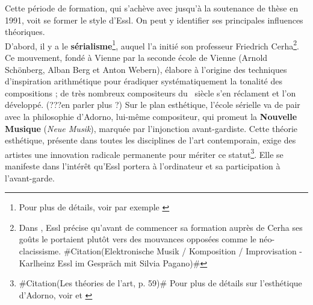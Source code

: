 \documentclass[a4paper,12pt]{article}
\newcommand{\zitat}[2]{\#Citation(#2)\#}
\begin{document}
Cette période de formation, qui s'achève avec jusqu'à la soutenance de thèse en 1991, voit se former le style d'Essl. On peut y identifier ses principales influences théoriques. \\
D'abord, il y a le \textbf{sérialisme}\footnote{Pour plus de détails, voir par exemple \cite{WODON !!!}}, auquel l'a initié son professeur Friedrich Cerha\footnote{Dans \cite{???}, Essl précise qu'avant de commencer sa formation auprès de Cerha ses goûts le portaient plutôt vers des mouvances opposées comme le néo-clacissisme. \zitat{Ich war damals ein junger Student, habe bei Friedrich Cerha Komposition studiert und steckte in einer massiven Krise, weil ich eigentlich von einer anderen Kompositionsauffassung herkam: Hindemith, Genzmer, Neoklassizismus waren damals für mich wichtig.}
{Elektronische Musik / Komposition / Improvisation - Karlheinz Essl im Gespräch mit Silvia Pagano}}. Ce mouvement, fondé à Vienne par la seconde école de Vienne (Arnold Schönberg, Alban Berg et Anton Webern), élabore à l'origine des techniques d'inspiration arithmétique pour éradiquer systématiquement la tonalité des compositions ; de très nombreux compositeurs du \XXe~siècle s'en réclament et l'on développé. (???en parler plus ?) Sur le plan esthétique, l'école sérielle va de pair avec la philosophie d'Adorno, lui-même compositeur, qui promeut la \textbf{Nouvelle Musique} (\emph{Neue Musik}), marquée par l'injonction avant-gardiste. Cette théorie esthétique, présente dans toutes les disciplines de l'art contemporain, exige des artistes une innovation radicale permanente pour mériter ce statut\footnote{\zitat{Le paradigme adornien d'une négativité en acte dans l'œuvre d'art se lit comme une injonction pour l'art moderne, et en partie pour l'art contemporain, d'avoir à intégrer l'action impérative de l'avant-garde. L'art se doit d'être critique --- traduisons : avant-gardiste --- et cet impératif s'ajoute à ceux déjà institués par les fondations précédentes.}
{Les théories de l'art, p. 59} Pour plus de détails sur l'esthétique d'Adorno, voir \cite{ESTHÉTIQUE} et \cite{adorno1949philosophie}}. Elle se manifeste dans l'intérêt qu'Essl portera à l'ordinateur et sa participation à l'avant-garde. \\
\end{document}

